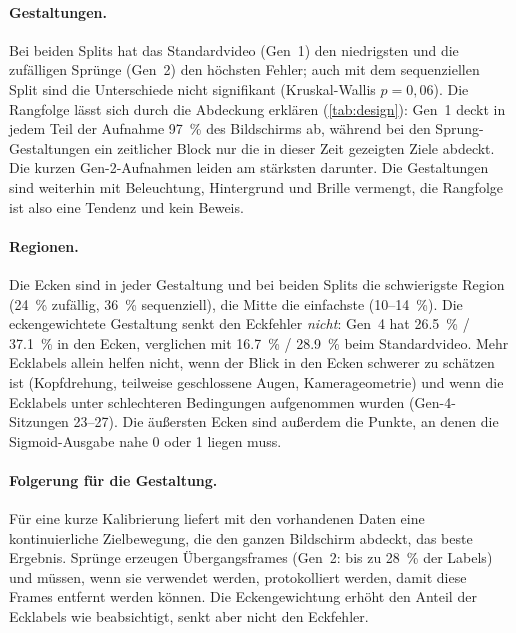 \documentclass[
  11pt,
  a4paper,
  oneside,
  DIV=12,
  BCOR=8mm,
  parskip=half,
  headings=normal,
  bibliography=totoc,
  listof=totoc
]{scrreprt}
\begin{document}
\paragraph{Gestaltungen.} Bei beiden Splits hat das Standardvideo (Gen~1) den
niedrigsten und die zufälligen Sprünge (Gen~2) den höchsten Fehler; auch mit
dem sequenziellen Split sind die Unterschiede nicht signifikant
(Kruskal-Wallis $p=0,06$). Die Rangfolge lässt sich durch die Abdeckung
erklären (\cref{tab:design}): Gen~1 deckt in jedem Teil der Aufnahme
\SI{97}{\percent} des Bildschirms ab, während bei den Sprung-Gestaltungen ein
zeitlicher Block nur die in dieser Zeit gezeigten Ziele abdeckt. Die kurzen
Gen-2-Aufnahmen leiden am stärksten darunter. Die Gestaltungen sind weiterhin
mit Beleuchtung, Hintergrund und Brille vermengt, die Rangfolge ist also eine
Tendenz und kein Beweis.

\paragraph{Regionen.} Die Ecken sind in jeder Gestaltung und bei beiden
Splits die schwierigste Region (\SI{24}{\percent} zufällig,
\SI{36}{\percent} sequenziell), die Mitte die einfachste
(\SI{10}{}--\SI{14}{\percent}). Die eckengewichtete Gestaltung senkt den
Eckfehler \emph{nicht}: Gen~4 hat \SI{26,5}{\percent} / \SI{37,1}{\percent}
in den Ecken, verglichen mit \SI{16,7}{\percent} / \SI{28,9}{\percent} beim
Standardvideo. Mehr Ecklabels allein helfen nicht, wenn der Blick in den
Ecken schwerer zu schätzen ist (Kopfdrehung, teilweise geschlossene Augen,
Kamerageometrie) und wenn die Ecklabels unter schlechteren Bedingungen
aufgenommen wurden (Gen-4-Sitzungen 23--27). Die äußersten Ecken sind außerdem
die Punkte, an denen die Sigmoid-Ausgabe nahe 0 oder 1 liegen muss.

\paragraph{Folgerung für die Gestaltung.} Für eine kurze Kalibrierung liefert
mit den vorhandenen Daten eine kontinuierliche Zielbewegung, die den ganzen
Bildschirm abdeckt, das beste Ergebnis. Sprünge erzeugen Übergangsframes
(Gen~2: bis zu \SI{28}{\percent} der Labels) und müssen, wenn sie verwendet
werden, protokolliert werden, damit diese Frames entfernt werden können. Die
Eckengewichtung erhöht den Anteil der Ecklabels wie beabsichtigt, senkt aber
nicht den Eckfehler.

\end{document}
